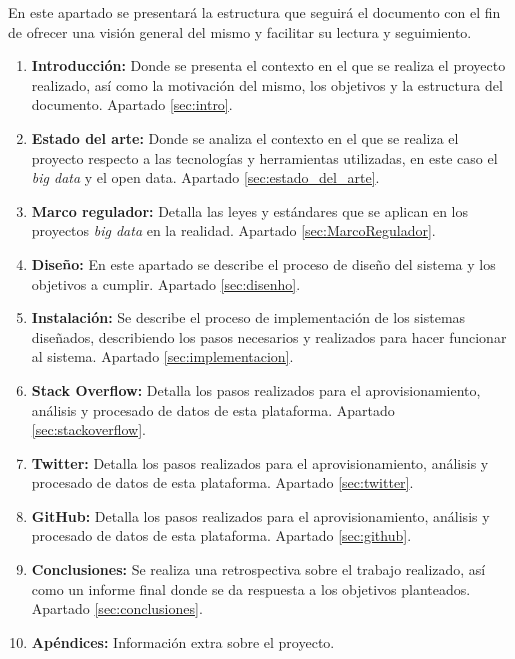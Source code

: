 En este apartado se presentará la estructura que seguirá el documento con el fin de ofrecer una visión general del mismo y facilitar su lectura y seguimiento.

\begin{enumerate}
	\item \textbf{Introducción:} Donde se presenta el contexto en el que se realiza el proyecto realizado, así como la motivación del mismo, los objetivos y la estructura del documento. Apartado \ref{sec:intro}.
	
	\item \textbf{Estado del arte:} Donde se analiza el contexto en el que se realiza el proyecto respecto a las tecnologías y herramientas utilizadas, en este caso el \textit{big data} y el open data. Apartado \ref{sec:estado_del_arte}.
	
	\item \textbf{Marco regulador:} Detalla las leyes y estándares que se aplican en los proyectos \textit{big data} en la realidad. Apartado \ref{sec:MarcoRegulador}.

	\item \textbf{Diseño:} En este apartado se describe el proceso de diseño del sistema y los objetivos a cumplir. Apartado \ref{sec:disenho}.

	\item \textbf{Instalación:} Se describe el proceso de implementación de los sistemas diseñados, describiendo los pasos necesarios y realizados para hacer funcionar al sistema. Apartado \ref{sec:implementacion}.

	\item \textbf{Stack Overflow:} Detalla los pasos realizados para el aprovisionamiento, análisis y procesado de datos de esta plataforma. Apartado \ref{sec:stackoverflow}.
	
	\item \textbf{Twitter:} Detalla los pasos realizados para el aprovisionamiento, análisis y procesado de datos de esta plataforma. Apartado \ref{sec:twitter}.
	
	\item \textbf{GitHub:} Detalla los pasos realizados para el aprovisionamiento, análisis y procesado de datos de esta plataforma. Apartado \ref{sec:github}.
	
	\item \textbf{Conclusiones:} Se realiza una retrospectiva sobre el trabajo realizado, así como un informe final donde se da respuesta a los objetivos planteados. Apartado \ref{sec:conclusiones}.
	
	\item \textbf{Apéndices:} Información extra sobre el proyecto.

\end{enumerate}